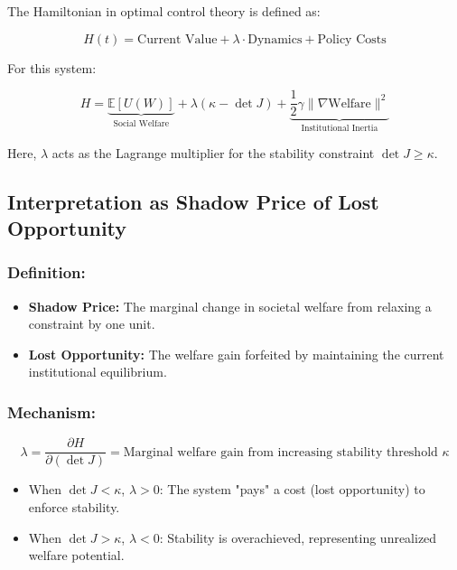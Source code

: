 \documentclass[10pt]{article}
\theoremstyle{definition}
\begin{document}
The Hamiltonian in optimal control theory is defined as:

\begin{equation}
H(t) = \text{Current Value} + \lambda \cdot \text{Dynamics} + \text{Policy Costs}
\end{equation}

For this system:

\begin{equation}
H = \underbrace{\mathbb{E}[U(W)]}_{\text{Social Welfare}} + \lambda(\kappa - \det J) + \underbrace{\frac{1}{2}\gamma \|\nabla \text{Welfare}\|^2}_{\text{Institutional Inertia}}
\end{equation}

Here, $\lambda$ acts as the Lagrange multiplier for the stability constraint $\det J \geq \kappa$.

\subsection{Interpretation as Shadow Price of Lost Opportunity}

\subsubsection{Definition:}

\begin{itemize}
    \item \textbf{Shadow Price:} The marginal change in societal welfare from relaxing a constraint by one unit.
    \item \textbf{Lost Opportunity:} The welfare gain forfeited by maintaining the current institutional equilibrium.
\end{itemize}

\subsubsection{Mechanism:}

\begin{equation}
\lambda = \frac{\partial H}{\partial (\det J)} = \text{Marginal welfare gain from increasing stability threshold } \kappa
\end{equation}

\begin{itemize}
    \item When $\det J < \kappa$, $\lambda > 0$: The system "pays" a cost (lost opportunity) to enforce stability.
    \item When $\det J > \kappa$, $\lambda < 0$: Stability is overachieved, representing unrealized welfare potential.
\end{itemize}
\end{document}
